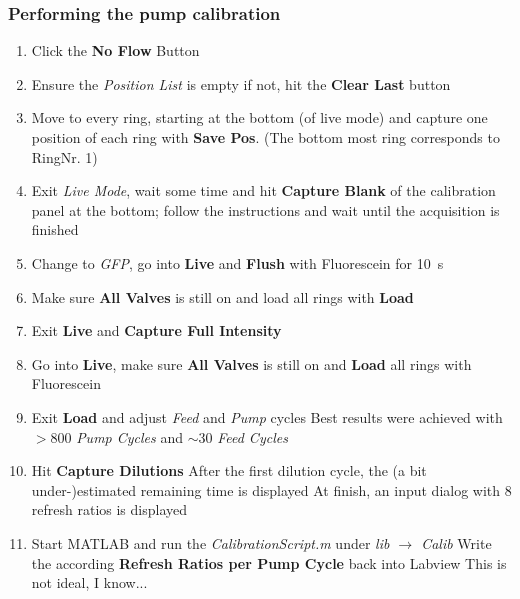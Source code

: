 \documentclass{article}
\newcounter{ListCounter}
\begin{document}
	\subsubsection{Performing the pump calibration}
	\begin{enumerate}
		\setcounter{enumi}{\value{ListCounter}}
	\item Click the \textbf{No Flow} Button
	\item Ensure the \textit{Position List} is empty
	\subitem if not, hit the \textbf{Clear Last} button
	\item Move to every ring, starting at the bottom (of live mode) and capture one position of each ring with \textbf{Save Pos}. (The bottom most ring corresponds to RingNr. 1)
	\item Exit \textit{Live Mode}, wait some time and hit \textbf{Capture Blank} of the calibration panel at the bottom; follow the instructions and wait until the acquisition is finished
	\item Change to \textit{GFP}, go into \textbf{Live} and \textbf{Flush} with Fluorescein for \SI{10}{\second}
	\item Make sure \textbf{All Valves} is still on and load all rings with \textbf{Load}
	\item Exit \textbf{Live} and \textbf{Capture Full Intensity}
	\item Go into \textbf{Live}, make sure \textbf{All Valves} is still on and \textbf{Load} all rings with Fluorescein
	\item Exit \textbf{Load} and adjust \textit{Feed} and \textit{Pump} cycles
	\subitem Best results were achieved with $>$800 \textit{Pump Cycles} and $\sim$30 \textit{Feed Cycles}
	\item Hit \textbf{Capture Dilutions}
	\subitem After the first dilution cycle, the (a bit under-)estimated remaining time is displayed 
	\subitem At finish, an input dialog with 8 refresh ratios is displayed
	\item Start MATLAB and run the \textit{CalibrationScript.m} under \textit{lib $\rightarrow$ Calib}
	\subitem Write the according \textbf{Refresh Ratios per Pump Cycle} back into Labview
	\subitem This is not ideal, I know...	\setcounter{ListCounter}{\value{enumi}}
\end{enumerate}
\end{document}
